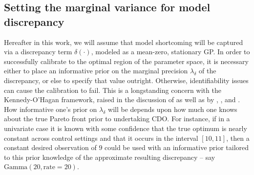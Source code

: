 \documentclass{article}
\begin{document}
\subsection{Setting the marginal variance for model discrepancy}\label{mvfmd}

Hereafter in this work, we will assume that model shortcoming will be captured via a discrepancy term $\delta(\cdot)$, modeled as a mean-zero, stationary GP. 
%
In order to successfully calibrate to the optimal region of the parameter space, it is necessary either to place an informative prior on the marginal precision $\lambda_\delta$ of the discrepancy, or else to specify that value outright. 
%
Otherwise, identifiability issues can cause the calibration to fail.
%
This is a longstanding concern with the Kennedy-O'Hagan framework, raised in the discussion of \cite{Kennedy2001} as well as by \cite{Bayarri2007}, \cite{Tuo2015}, and \cite{Plumlee2017}.
%
How informative one's prior on $\lambda_\delta$ will be depends upon how much one knows about the true Pareto front prior to undertaking CDO.
%
For instance, if in a univariate case it is known with some confidence that the true optimum is nearly constant across control settings and that it occurs in the interval $[10,11]$, then a constant desired observation of $9$ could be used with an informative prior tailored to this prior knowledge of the approximate resulting discrepancy -- say $\mathrm{Gamma}(20,\mathrm{rate}=20)$.
%
\end{document}
